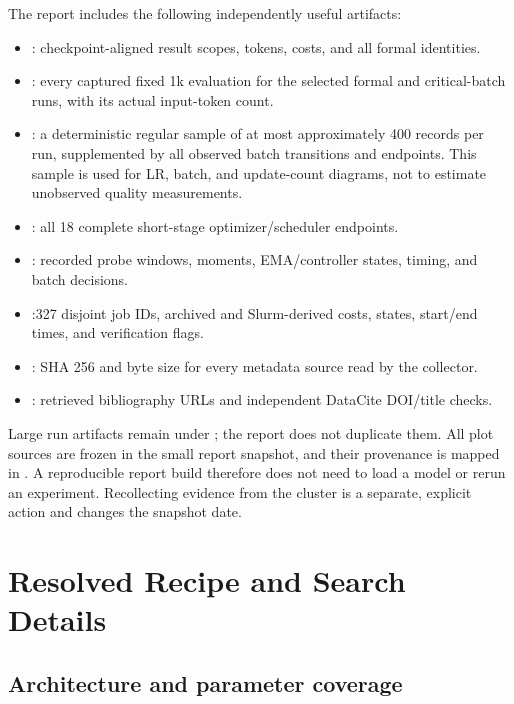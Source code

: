 The report includes the following independently useful artifacts:
\begin{itemize}
  \item {}: checkpoint-aligned result scopes, tokens, costs, and all formal identities.
  \item {}: every captured fixed 1k evaluation for the selected formal and critical-batch runs, with its actual input-token count.
  \item {}: a deterministic regular sample of at most approximately 400 records per run, supplemented by all observed batch transitions and endpoints. This sample is used for LR, batch, and update-count diagrams, not to estimate unobserved quality measurements.
  \item {}: all 18 complete short-stage optimizer/scheduler endpoints.
  \item {}: recorded probe windows, moments, EMA/controller states, timing, and batch decisions.
  \item {}:327 disjoint job IDs, archived and Slurm-derived costs, states, start/end times, and verification flags.
  \item {}: SHA 256 and byte size for every metadata source read by the collector.
  \item {}: retrieved bibliography URLs and independent DataCite DOI/title checks.
\end{itemize}

Large run artifacts remain under ; the report does not duplicate them. All plot sources are frozen in the small report snapshot, and their provenance is mapped in . A reproducible report build therefore does not need to load a model or rerun an experiment. Recollecting evidence from the cluster is a separate, explicit action and changes the snapshot date.

\section{Resolved Recipe and Search Details}
\label{app:config}

\subsection{Architecture and parameter coverage}

